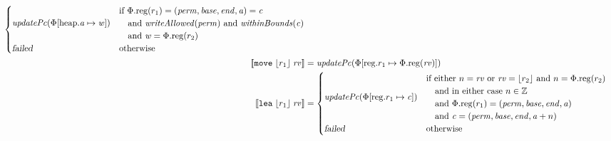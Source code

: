 \documentclass{article}
\newcommand{\update}[2]{[#1 \mapsto #2]}
\newcommand{\sem}[1]{\left\llbracket #1 \right\rrbracket}
\newcommand{\var}[1]{\mathit{#1}}
\newcommand{\rv}{\var{rv}}
\newcommand{\addr}{\var{a}}
\newcommand{\start}{\var{base}}
\newcommand{\addrend}{\var{end}}
\newcommand{\perm}{\var{perm}}
\newcommand{\stdcap}[1][\perm]{\left(#1,\start,\addrend,\addr \right)}
\newcommand{\plainproj}[1]{\mathrm{#1}}
\newcommand{\memreg}[1][\Phi]{#1.\plainproj{reg}}
\newcommand{\updateHeap}[3][\Phi]{#1\update{\plainproj{heap}.#2}{#3}}
\newcommand{\updateReg}[3][\Phi]{#1\update{\plainproj{reg}.#2}{#3}}
\newcommand{\failed}{\textsl{failed}}
\newcommand{\plainfun}[2]{
  \ifthenelse{\equal{#2}{}}
             {\mathit{#1}}
             {\mathit{#1}(#2)}
}
\newcommand{\writeAllowed}[1]{\plainfun{writeAllowed}{#1}}
\newcommand{\withinBounds}[1]{\plainfun{withinBounds}{#1}}
\newcommand{\stdUpdatePc}[1]{\plainfun{updatePc}{#1}}
\newcommand{\ints}{\mathbb{Z}}
\newcommand{\refreg}[1]{\lfloor #1 \rfloor}
\newcommand{\zinstr}[1]{\mathtt{#1}}
\newcommand{\twoinstr}[3]{\zinstr{#1} \; #2 \; #3}
\newcommand{\move}[2]{\twoinstr{move}{#1}{#2}}
\newcommand{\lea}[2]{\twoinstr{lea}{#1}{#2}}
\begin{document}
\begin{align*}
                                             \begin{cases}
                                               \stdUpdatePc{\updateHeap{\addr}{\var{w}}} &
                                               \arraycolsep=0pt
                                               \begin{array}{l}
                                                 \text{if }\memreg(r_1) = (\perm,\start,\addrend,\addr) = \var{c} \\
                                                 \quad\text{and }\writeAllowed{\perm} \text{ and } \withinBounds{\var{c}} \\
                                                 \quad\text{and }\var{w} = \memreg(r_2)
                                               \end{array}\\
                                               \failed & \text{otherwise }
                                             \end{cases}\\
 \sem{\move{\refreg{r_1}}{\rv}}            & = \stdUpdatePc{\updateReg{r_1}{\memreg(\rv)}}
\\
  \sem{\lea{\refreg{r_1}}{\rv}}            & =
                                             \begin{cases}
                                               \stdUpdatePc{\updateReg{r_1}{\var{c}}} &
                                                 \arraycolsep=0pt
                                                 \begin{array}{l}
                                                   \text{if either $n = \rv$ or $\rv = \refreg{r_2}$ and $n = \memreg(r_2)$} \\
                                                   \quad\text{and in either case $n \in \ints $} \\
                                                   \quad\text{and $\memreg(r_1) = \stdcap$}\\
                                                   \quad\text{and $\var{c} = (\perm,\start,\addrend,\addr + n)$}
                                                 \end{array}\\
                                               \failed               & \text{otherwise}
                                             \end{cases} 
\\

\end{align*}
\end{document}
